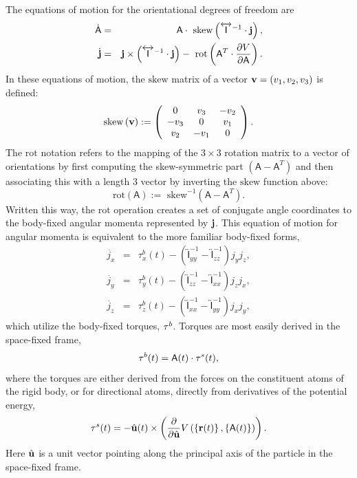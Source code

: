 \documentclass[]{book}
\begin{document}
The equations of motion for the orientational degrees of freedom are
\begin{eqnarray}
\dot{\mathsf{A}} & = & \mathsf{A} \cdot
\mbox{ skew}\left(\overleftrightarrow{\mathsf{I}}^{-1} \cdot {\bf j}\right),\\
\dot{{\bf j}} & = & {\bf j} \times \left( \overleftrightarrow{\mathsf{I}}^{-1}
\cdot {\bf j} \right) - \mbox{ rot}\left(\mathsf{A}^{T} \cdot \frac{\partial
V}{\partial \mathsf{A}} \right).
\end{eqnarray}
In these equations of motion, the $\mbox{skew}$ matrix of a vector
${\bf v} = \left( v_1, v_2, v_3 \right)$ is defined:
\begin{equation}
\mbox{skew}\left( {\bf v} \right) := \left( 
\begin{array}{ccc}
0 & v_3 & - v_2 \\
-v_3 & 0 & v_1 \\
v_2 & -v_1 & 0 
\end{array}
\right).
\end{equation}
The $\mbox{rot}$ notation refers to the mapping of the $3 \times 3$
rotation matrix to a vector of orientations by first computing the
skew-symmetric part $\left(\mathsf{A} - \mathsf{A}^{T}\right)$ and
then associating this with a length 3 vector by inverting the
$\mbox{skew}$ function above:
\begin{equation}
\mbox{rot}\left(\mathsf{A}\right) := \mbox{ skew}^{-1}\left(\mathsf{A}
- \mathsf{A}^{T} \right).
\end{equation}
Written this way, the $\mbox{rot}$ operation creates a set of
conjugate angle coordinates to the body-fixed angular momenta
represented by ${\bf j}$.  This equation of motion for angular momenta
is equivalent to the more familiar body-fixed forms,
\begin{eqnarray}
\dot{j_{x}} & = & \tau^b_x(t)  -
\left(\overleftrightarrow{\mathsf{I}}_{yy}^{-1} - \overleftrightarrow{\mathsf{I}}_{zz}^{-1} \right) j_y j_z, \\
\dot{j_{y}} & = & \tau^b_y(t) -
\left(\overleftrightarrow{\mathsf{I}}_{zz}^{-1} - \overleftrightarrow{\mathsf{I}}_{xx}^{-1} \right) j_z j_x,\\
\dot{j_{z}} & = & \tau^b_z(t) -
\left(\overleftrightarrow{\mathsf{I}}_{xx}^{-1} - \overleftrightarrow{\mathsf{I}}_{yy}^{-1} \right) j_x j_y, 
\end{eqnarray}
which utilize the body-fixed torques, ${\bf \tau}^b$. Torques are
most easily derived in the space-fixed frame, 
\begin{equation}
{\bf \tau}^b(t) = \mathsf{A}(t) \cdot {\bf \tau}^s(t),
\end{equation}
where the torques are either derived from the forces on the
constituent atoms of the rigid body, or for directional atoms,
directly from derivatives of the potential energy,
\begin{equation}
{\bf \tau}^s(t) = - \hat{\bf u}(t) \times \left( \frac{\partial}
{\partial \hat{\bf u}} V\left(\left\{ {\bf r}(t) \right\}, \left\{
\mathsf{A}(t) \right\}\right) \right).
\end{equation}
Here $\hat{\bf u}$ is a unit vector pointing along the principal axis
of the particle in the space-fixed frame.
\end{document}
